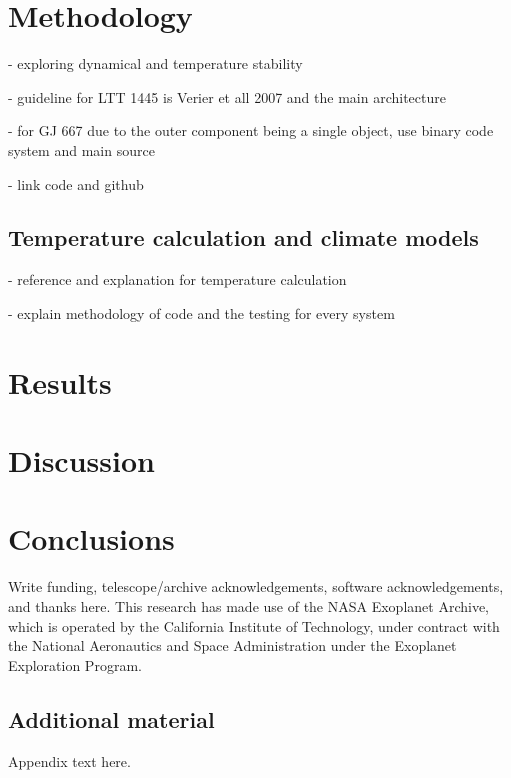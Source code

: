 \documentclass[referee]{aa}
\begin{document}
    \section{Methodology}\label{sec:method}

    - exploring dynamical and temperature stability

    - guideline for LTT 1445 is Verier et all 2007 and the main architecture

    - for GJ 667 due to the outer component being a single object, use binary code system and main source

    - link code and github

    \subsection{Temperature calculation and climate models}\label{sec:temp}
    - reference and explanation for temperature calculation

    - explain methodology of code and the testing for every system
    
    \section{Results}\label{sec:result}
    
    \section{Discussion}\label{sec:discuss}
    
    \section{Conclusions}\label{sec:conclusion}
    
    \begin{acknowledgements}
    Write funding, telescope/archive acknowledgements, software acknowledgements, and thanks here.
    This research has made use of the NASA Exoplanet Archive, which is operated
    by the California Institute of Technology, under contract with the National
    Aeronautics and Space Administration under the Exoplanet Exploration Program.
    \end{acknowledgements}
    
    
    
    
    \begin{appendix}
    \section{Additional material}
    Appendix text here.
    \end{appendix}
    
\end{document}
